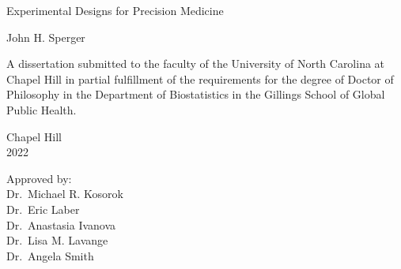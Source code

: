 \documentclass[12pt,,letterpaper,twoside]{report}
\begin{document}

\begin{titlepage}
\begin{center}


\vspace{2in}
\begin{singlespace}
Experimental Designs for Precision Medicine
\end{singlespace}


\vspace{61pt} %
John H. Sperger
\end{center}

\vspace{50pt}
\begin{singlespace}
\begin{center}
\noindent 
A dissertation submitted to the faculty of the University of North Carolina at Chapel Hill in partial fulfillment of the requirements for the degree of Doctor
of Philosophy in the Department of Biostatistics in the Gillings School
of Global Public Health.
\end{center}
\end{singlespace}


\vspace{50pt}
\begin{center}
\begin{singlespace} 
Chapel Hill\\
2022
\end{singlespace}
\end{center}

 

\vfill
\begin{flushright}
\begin{minipage}[t]{1.5in} 
Approved by:\\
 
 Dr.~Michael R. Kosorok \\  Dr.~Eric Laber \\ 
 Dr.~Anastasia Ivanova \\  Dr.~Lisa M. Lavange \\  Dr.~Angela Smith \\ 

\end{minipage}
\end{flushright}

\end{titlepage}
\end{document}
